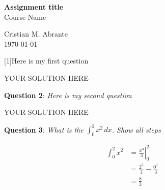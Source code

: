 \documentclass{article} %
\newcommand{\question}[2][]{\begin{flushleft}
        \textbf{Question #1}: \textit{#2}

\end{flushleft}}
\newcommand{\maketitletwo}[2][]{
    \begin{center}
        \Large{
            \textbf{Assignment title}\\ %
            Course Name                 %
        }
        \vspace{5pt}
        
        \normalsize{Cristian M. Abrante\\  %
        \today}                          %
        \vspace{15pt}
        
    \end{center}
}
\begin{document}
    \maketitletwo[5]  %
    
    \question[1]{Here is my first question} 
    
    YOUR SOLUTION HERE\\
    
    \question[2]{Here is my second question}
    
    YOUR SOLUTION HERE
    
    \question[3]{What is the \Large{$\int_0^2 x^2 \, dx $}\normalsize{. Show all steps}}
    
    \begin{align*}
    \int_0^2 x^2 &= \left. \frac{x^3}{3} \right|_0^2 \\
                 &= \frac{2^3}{3}-\frac{0^3}{3}\\
                 &= \frac{8}{3}
    \end{align*}
\end{document}
